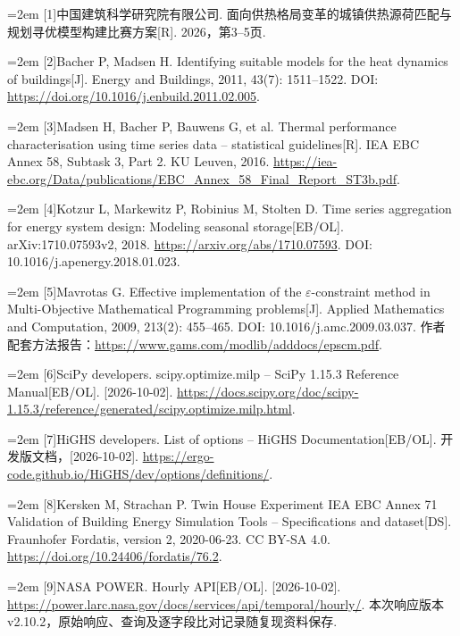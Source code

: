 \documentclass[12pt,a4paper]{article}
\newenvironment{refsectionflush}
  {\par\sloppy\setlength{\parindent}{0pt}\setlength{\parskip}{0pt}}
  {\par\fussy}
\newcommand{\refentry}[2]{%
  \par\noindent\hangindent=2em\hangafter=1
  [#1]\enspace #2\par}
\begin{document}
\begin{refsectionflush}
\refentry{1}{中国建筑科学研究院有限公司. 面向供热格局变革的城镇供热源荷匹配与规划寻优模型构建比赛方案{[}R{]}. 2026，第3--5页.}
\refentry{2}{Bacher P, Madsen H. Identifying suitable models for the heat dynamics of buildings{[}J{]}. Energy and Buildings, 2011, 43(7): 1511--1522. DOI: \url{https://doi.org/10.1016/j.enbuild.2011.02.005}.}
\refentry{3}{Madsen H, Bacher P, Bauwens G, et al. Thermal performance characterisation using time series data -- statistical guidelines{[}R{]}. IEA EBC Annex 58, Subtask 3, Part 2. KU Leuven, 2016. \url{https://iea-ebc.org/Data/publications/EBC_Annex_58_Final_Report_ST3b.pdf}.}
\refentry{4}{Kotzur L, Markewitz P, Robinius M, Stolten D. Time series aggregation for energy system design: Modeling seasonal storage{[}EB/OL{]}. arXiv:1710.07593v2, 2018. \url{https://arxiv.org/abs/1710.07593}. DOI: 10.1016/j.apenergy.2018.01.023.}
\refentry{5}{Mavrotas G. Effective implementation of the $\varepsilon$-constraint method in Multi-Objective Mathematical Programming problems{[}J{]}. Applied Mathematics and Computation, 2009, 213(2): 455--465. DOI: 10.1016/j.amc.2009.03.037. 作者配套方法报告：\url{https://www.gams.com/modlib/adddocs/epscm.pdf}.}
\refentry{6}{SciPy developers. scipy.optimize.milp -- SciPy 1.15.3 Reference Manual{[}EB/OL{]}. [2026-10-02]. \url{https://docs.scipy.org/doc/scipy-1.15.3/reference/generated/scipy.optimize.milp.html}.}
\refentry{7}{HiGHS developers. List of options -- HiGHS Documentation{[}EB/OL{]}. 开发版文档，[2026-10-02]. \url{https://ergo-code.github.io/HiGHS/dev/options/definitions/}.}
\refentry{8}{Kersken M, Strachan P. Twin House Experiment IEA EBC Annex 71 Validation of Building Energy Simulation Tools -- Specifications and dataset{[}DS{]}. Fraunhofer Fordatis, version 2, 2020-06-23. CC BY-SA 4.0. \url{https://doi.org/10.24406/fordatis/76.2}.}
\refentry{9}{NASA POWER. Hourly API{[}EB/OL{]}. [2026-10-02]. \url{https://power.larc.nasa.gov/docs/services/api/temporal/hourly/}. 本次响应版本v2.10.2，原始响应、查询及逐字段比对记录随复现资料保存.}


\end{refsectionflush}
\end{document}
